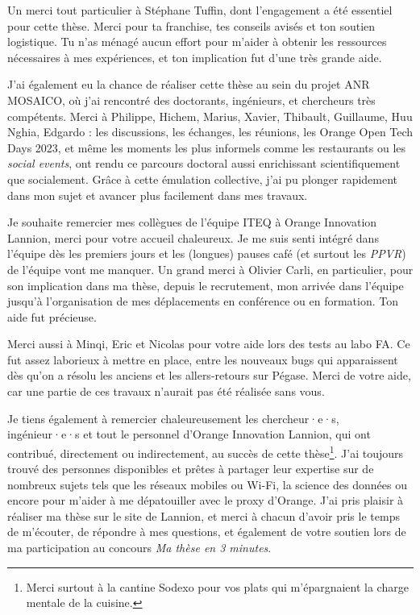 Un merci tout particulier à Stéphane Tuffin, dont l'engagement a été essentiel pour cette thèse. Merci pour ta franchise, tes conseils avisés et ton soutien logistique. Tu n'as ménagé aucun effort pour m'aider à obtenir les ressources nécessaires à mes expériences, et ton implication fut d'une très grande aide.

J’ai également eu la chance de réaliser cette thèse au sein du projet ANR MOSAICO, où j’ai rencontré des doctorants, ingénieurs, et chercheurs très compétents. Merci à Philippe, Hichem, Marius, Xavier, Thibault, Guillaume, Huu Nghia, Edgardo : les discussions, les échanges, les réunions, les Orange Open Tech Days 2023, et même les moments les plus informels comme les restaurants ou les \textit{social events}, ont rendu ce parcours doctoral aussi enrichissant scientifiquement que socialement. Grâce à cette émulation collective, j’ai pu plonger rapidement dans mon sujet et avancer plus facilement dans mes travaux.

Je souhaite remercier mes collègues de l'équipe ITEQ à Orange Innovation Lannion, merci pour votre accueil chaleureux. Je me suis senti intégré dans l'équipe dès les premiers jours et les (longues) pauses café (et surtout les \textit{PPVR}) de l'équipe vont me manquer. Un grand merci à Olivier Carli, en particulier, pour son implication dans ma thèse, depuis le recrutement, mon arrivée dans l'équipe jusqu'à l'organisation de mes déplacements en conférence ou en formation. Ton aide fut précieuse.

Merci aussi à Minqi, Eric et Nicolas pour votre aide lors des tests au labo FA. Ce fut assez laborieux à mettre en place, entre les nouveaux bugs qui apparaissent dès qu'on a résolu les anciens et les allers-retours sur Pégase. Merci de votre aide, car une partie de ces travaux n'aurait pas été réalisée sans vous.

Je tiens également à remercier chaleureusement les chercheur·e·s, ingénieur·e·s et tout le personnel d’Orange Innovation Lannion, qui ont contribué, directement ou indirectement, au succès de cette thèse\footnote{Merci surtout à la cantine Sodexo pour vos plats qui m'épargnaient la charge mentale de la cuisine.}. J’ai toujours trouvé des personnes disponibles et prêtes à partager leur expertise sur de nombreux sujets tels que les réseaux mobiles ou Wi-Fi, la science des données ou encore pour m'aider à me dépatouiller avec le proxy d'Orange. J'ai pris plaisir à réaliser ma thèse sur le site de Lannion, et merci à chacun d’avoir pris le temps de m’écouter, de répondre à mes questions, et également de votre soutien lors de ma participation au concours \textit{Ma thèse en 3 minutes}.   


